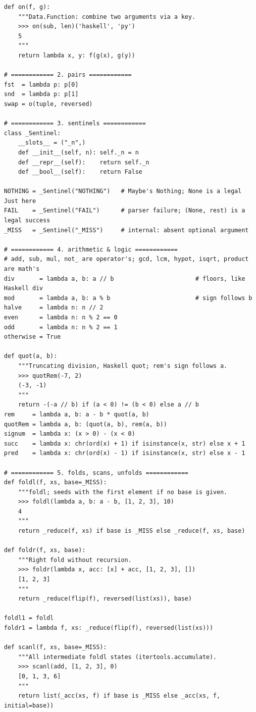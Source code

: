 \documentclass[10pt,letterpaper]{book}
\begin{document}
\begin{lstlisting}[style=file]
def on(f, g):
    """Data.Function: combine two arguments via a key.
    >>> on(sub, len)('haskell', 'py')
    5
    """
    return lambda x, y: f(g(x), g(y))

# ============ 2. pairs ============
fst  = lambda p: p[0]
snd  = lambda p: p[1]
swap = o(tuple, reversed)

# ============ 3. sentinels ============
class _Sentinel:
    __slots__ = ("_n",)
    def __init__(self, n): self._n = n
    def __repr__(self):    return self._n
    def __bool__(self):    return False

NOTHING = _Sentinel("NOTHING")   # Maybe's Nothing; None is a legal Just here
FAIL    = _Sentinel("FAIL")      # parser failure; (None, rest) is a legal success
_MISS   = _Sentinel("_MISS")     # internal: absent optional argument

# ============ 4. arithmetic & logic ============
# add, sub, mul, not_ are operator's; gcd, lcm, hypot, isqrt, product are math's
div       = lambda a, b: a // b                       # floors, like Haskell div
mod       = lambda a, b: a % b                        # sign follows b
halve     = lambda n: n // 2
even      = lambda n: n % 2 == 0
odd       = lambda n: n % 2 == 1
otherwise = True

def quot(a, b):
    """Truncating division, Haskell quot; rem's sign follows a.
    >>> quotRem(-7, 2)
    (-3, -1)
    """
    return -(-a // b) if (a < 0) != (b < 0) else a // b
rem     = lambda a, b: a - b * quot(a, b)
quotRem = lambda a, b: (quot(a, b), rem(a, b))
signum  = lambda x: (x > 0) - (x < 0)
succ    = lambda x: chr(ord(x) + 1) if isinstance(x, str) else x + 1
pred    = lambda x: chr(ord(x) - 1) if isinstance(x, str) else x - 1

# ============ 5. folds, scans, unfolds ============
def foldl(f, xs, base=_MISS):
    """foldl; seeds with the first element if no base is given.
    >>> foldl(lambda a, b: a - b, [1, 2, 3], 10)
    4
    """
    return _reduce(f, xs) if base is _MISS else _reduce(f, xs, base)

def foldr(f, xs, base):
    """Right fold without recursion.
    >>> foldr(lambda x, acc: [x] + acc, [1, 2, 3], [])
    [1, 2, 3]
    """
    return _reduce(flip(f), reversed(list(xs)), base)

foldl1 = foldl
foldr1 = lambda f, xs: _reduce(flip(f), reversed(list(xs)))

def scanl(f, xs, base=_MISS):
    """All intermediate foldl states (itertools.accumulate).
    >>> scanl(add, [1, 2, 3], 0)
    [0, 1, 3, 6]
    """
    return list(_acc(xs, f) if base is _MISS else _acc(xs, f, initial=base))


\end{lstlisting}
\end{document}
